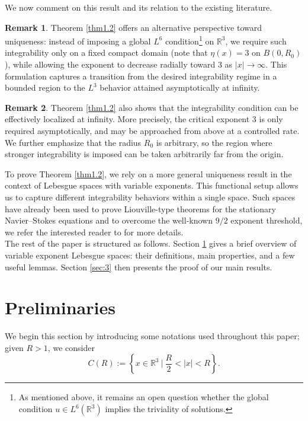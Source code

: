 \documentclass[a4paper,12pt]{amsart}
\theoremstyle{definition}
\newtheorem{remark}{Remark}[section]
\theoremstyle{plain}
\begin{document}
\noindent We now comment on this result and its relation to the existing literature.

\begin{remark} 
Theorem \ref{thm1.2} offers an alternative perspective toward uniqueness: 
instead of imposing a global $L^6$ condition\footnote{As mentioned above, it remains an open question whether the global condition 
$u \in L^6(\mathbb{R}^3)$ implies the triviality of solutions.} on $\mathbb{R}^3$, 
we require such integrability only on a fixed compact domain 
(note that $\eta(x)=3$ on $B(0,R_0)$), while allowing the exponent to 
decrease radially toward $3$ as $|x| \to \infty$. 
This formulation captures a transition from the desired  integrability regime 
in a bounded region to the $L^3$ behavior attained asymptotically at infinity.
\end{remark}

\begin{remark}
Theorem \ref{thm1.2} also shows that the integrability condition can be effectively 
localized at infinity. More precisely, the critical exponent $3$ is only required 
asymptotically, and may be approached from above at a controlled rate. 
We further emphasize that the radius $R_0$ is arbitrary, so the region where stronger 
integrability is imposed can be taken arbitrarily far from the origin.
\end{remark}


To prove Theorem \ref{thm1.2}, we rely on a more general uniqueness result in the context of Lebesgue spaces with variable exponents. This functional setup allows us to capture different integrability behaviors within a single space. Such spaces have already been used to prove Liouville-type theorems for the stationary Navier–Stokes equations and to overcome the well-known $9/2$ exponent threshold, we refer the interested reader to \cite{CV2023} for more details.\\

The rest of the paper is structured as follows. Section \ref{sect:2} gives a brief overview of variable exponent Lebesgue spaces: their definitions, main properties, and a few useful lemmas. Section \ref{sec:3} then presents the proof of our main results.


\section{Preliminaries}\label{sect:2}

We begin this section by introducing some notations used throughout this paper; given $R>1$, we consider 
\[
C( R) := \left\{ x \in \mathbb{R}^3 \ \big | \ \frac R2 < |x| < R \right\}.
\]
\end{document}

